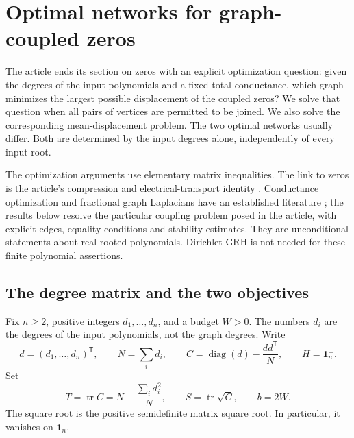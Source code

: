 \section{Optimal networks for graph-coupled zeros}
\label{net:sec:optimal}

The article ends its section on zeros with an explicit optimization question:
given the degrees of the input polynomials and a fixed total conductance,
which graph minimizes the largest possible displacement of the coupled
zeros? We solve that question when all pairs of vertices are permitted to
be joined. We also solve the corresponding mean-displacement problem.
The two optimal networks usually differ. Both are determined by the input
degrees alone, independently of every input root.

The optimization arguments use elementary matrix inequalities. The link to
zeros is the article's compression and electrical-transport identity
\cite[\texttt{zer:thm:electrical}]{ProveItArticle}. Conductance optimization
and fractional graph Laplacians have an established literature
\cite{GhoshBoydSaberi2008,Schweitzer2022}; the results below resolve the
particular coupling problem posed in the article, with explicit edges,
equality conditions and stability estimates. They are unconditional
statements about real-rooted polynomials. Dirichlet GRH is not needed for
these finite polynomial assertions.

\subsection{The degree matrix and the two objectives}

Fix $n\ge2$, positive integers $d_1,\ldots,d_n$, and a budget $W>0$.
The numbers $d_i$ are the degrees of the input polynomials, not the graph
degrees. Write
\begin{equation}\label{net:eq:degree-matrix}
 d=(d_1,\ldots,d_n)^{\mathsf T},\qquad N=\sum_i d_i,\qquad
 C=\operatorname{diag}(d)-\frac{dd^{\mathsf T}}{N},\qquad
 H=\mathbf1_n^{\perp}.
\end{equation}
Set
\begin{equation}\label{net:eq:TS}
 T=\operatorname{tr}C=N-\frac{\sum_i d_i^2}{N},\qquad
 S=\operatorname{tr}\sqrt C,\qquad b=2W.
\end{equation}
The square root is the positive semidefinite matrix square root. In
particular, it vanishes on $\mathbf1_n$.

